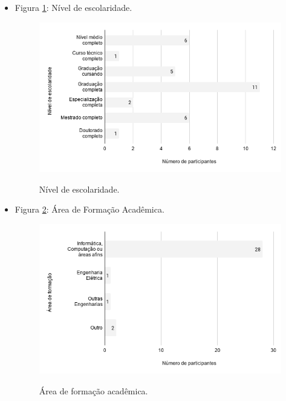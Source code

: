 \begin{itemize}
    
    \item Figura \ref{figure:s_escolaridade}: Nível de escolaridade.
        \begin{figure}[!htb]
        \centering
        \includegraphics[width=.80\textwidth]{images/s_escolaridade.png}
        \label{figure:s_escolaridade}
        \caption{Nível de escolaridade.}
        \end{figure}
    
    
    \item Figura \ref{figure:s_areaformacaoacademica}: Área de Formação Acadêmica.
        \begin{figure}[!htb]
        \centering
        \includegraphics[width=.80\textwidth]{images/s_areaformacaoacademica.png}
        \label{figure:s_areaformacaoacademica}
        \caption{Área de formação acadêmica.}
        \end{figure}
    

\end{itemize}
